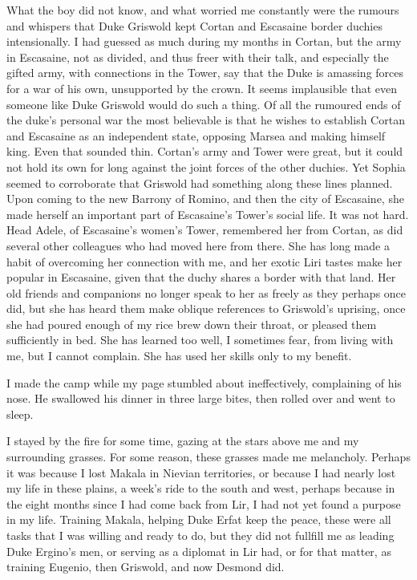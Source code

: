 \documentclass{article}
\begin{document}
What the boy did not know, and what worried me constantly were the rumours and whispers that Duke Griswold kept Cortan and Escasaine border duchies intensionally. I had guessed as much during my months in Cortan, but the army in Escasaine, not as divided, and thus freer with their talk, and especially the gifted army, with connections in the Tower, say that the Duke is amassing forces for a war of his own, unsupported by the crown. It seems implausible that even someone like Duke Griswold would do such a thing. Of all the rumoured ends of the duke's personal war the most believable is that he wishes to establish Cortan and Escasaine as an independent state, opposing Marsea and making himself king. Even that sounded thin. Cortan's army and Tower were great, but it could not hold its own for long against the joint forces of the other duchies. Yet Sophia seemed to corroborate that Griswold had something along these lines planned. Upon coming to the new Barrony of Romino, and then the city of Escasaine, she made herself an important part of Escasaine's Tower's social life. It was not hard. Head Adele, of Escasaine's women's Tower, remembered her from Cortan, as did several other colleagues who had moved here from there. She has long made a habit of overcoming her connection with me, and her exotic Liri tastes make her popular in Escasaine, given that the duchy shares a border with that land. Her old friends and companions no longer speak to her as freely as they perhaps once did, but she has heard them make oblique references to Griswold's uprising, once she had  poured enough of my rice brew down their throat, or pleased them sufficiently in bed. She has learned too well, I sometimes fear, from living with me, but I cannot complain. She has used her skills only to my benefit. 

I made the camp while my page stumbled about ineffectively, complaining of his nose. He swallowed his dinner in three large bites, then rolled over and went to sleep.

I stayed by the fire for some time, gazing at the stars above me and my surrounding grasses. For some reason, these grasses made me melancholy. Perhaps it was because I lost Makala in Nievian territories, or because I had nearly lost my life in these plains, a week's ride to the south and west, perhaps because in the eight months since I had come back from Lir, I had not yet found a purpose in my life. Training Makala, helping Duke Erfat keep the peace, these were all tasks that I was willing and ready to do, but they did not fullfill me as leading Duke Ergino's men, or serving as a diplomat in Lir had, or for that matter, as training Eugenio, then Griswold, and now Desmond did.
\end{document}
